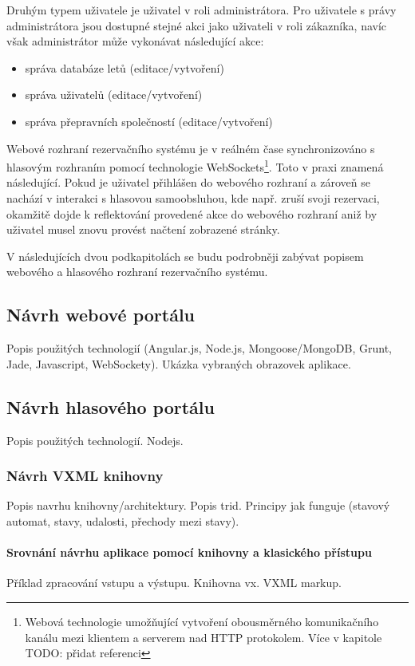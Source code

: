 \documentclass[ing,male,java,dept460]{diploma}						%
\begin{document}
Druhým typem uživatele je uživatel v roli administrátora. Pro uživatele s právy administrátora jsou dostupné stejné akci jako uživateli v roli zákazníka, navíc však administrátor může vykonávat následující akce:

\begin{itemize}
\item správa databáze letů (editace/vytvoření)
\item správa uživatelů (editace/vytvoření)
\item správa přepravních společností (editace/vytvoření)
\end{itemize}

Webové rozhraní rezervačního systému je v reálném čase synchronizováno s hlasovým rozhraním pomocí technologie WebSockets\footnote{Webová technologie umožňující vytvoření obousměrného komunikačního kanálu mezi klientem a serverem nad HTTP protokolem. Více v kapitole TODO: přidat referenci}. Toto v praxi znamená následující. Pokud je uživatel přihlášen do webového rozhraní a zároveň se nachází v interakci s hlasovou samoobsluhou, kde např. zruší svoji rezervaci, okamžitě dojde k reflektování provedené akce do webového rozhraní aniž by uživatel musel znovu provést načtení zobrazené stránky.

V následujících dvou podkapitolách se budu podrobněji zabývat popisem webového a hlasového rozhraní rezervačního systému.

\subsection{Návrh webové portálu}
Popis použitých technologií (Angular.js, Node.js, Mongoose/MongoDB, Grunt, Jade, Javascript, WebSockety). Ukázka vybraných obrazovek aplikace.

\subsection{Návrh hlasového portálu}
Popis použitých technologií. Nodejs.

\subsubsection{Návrh VXML knihovny}
Popis navrhu knihovny/architektury. Popis trid. Principy jak funguje (stavový automat, stavy, udalosti, přechody mezi stavy).

\paragraph{Srovnání návrhu aplikace pomocí knihovny a klasického přístupu}
Příklad zpracování vstupu a výstupu. Knihovna vx. VXML markup.
\end{document}
